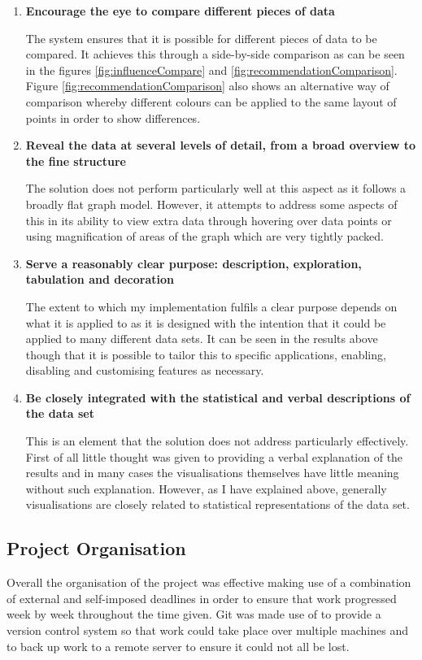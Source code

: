 \documentclass[12pt,a4paper]{article}
\begin{document}
\begin{enumerate}
\item {\bf Encourage the eye to compare different pieces of data}

The system ensures that it is possible for different pieces of data to be compared. It achieves this through a side-by-side comparison as can be seen in the figures \ref{fig:influenceCompare} and \ref{fig:recommendationComparison}. Figure \ref{fig:recommendationComparison} also shows an alternative way of comparison whereby different colours can be applied to the same layout of points in order to show differences.

\item {\bf Reveal the data at several levels of detail, from a broad overview to the fine structure}

The solution does not perform particularly well at this aspect as it follows a broadly flat graph model. However, it attempts to address some aspects of this in its ability to view extra data through hovering over data points or using magnification of areas of the graph which are very tightly packed.

\item {\bf Serve a reasonably clear purpose: description, exploration, tabulation and decoration}

The extent to which my implementation fulfils a clear purpose depends on what it is applied to as it is designed with the intention that it could be applied to many different data sets. It can be seen in the results above though that it is possible to tailor this to specific applications, enabling, disabling and customising features as necessary.

\item {\bf Be closely integrated with the statistical and verbal descriptions of the data set}

This is an element that the solution does not address particularly effectively. First of all little thought was given to providing a verbal explanation of the results and in many cases the visualisations themselves have little meaning without such explanation. However, as I have explained above, generally visualisations are closely related to statistical representations of the data set.
\end{enumerate}

\subsection{Project Organisation}

Overall the organisation of the project was effective making use of a combination of external and self-imposed deadlines in order to ensure that work progressed week by week throughout the time given. Git was made use of to provide a version control system so that work could take place over multiple machines and to back up work to a remote server to ensure it could not all be lost.
\end{document}
